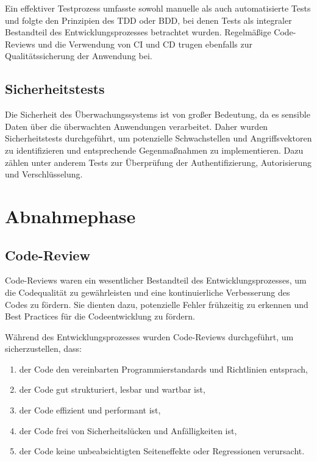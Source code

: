 \begin{flushleft}
			Ein effektiver Testprozess umfasste sowohl manuelle als auch automatisierte Tests und folgte den Prinzipien des \acs{TDD} oder \acs{BDD}, bei denen Tests als integraler Bestandteil des Entwicklungsprozesses betrachtet wurden. Regelmäßige Code-Reviews und die Verwendung von \acs{CI} und \acs{CD} trugen ebenfalls zur Qualitätssicherung der Anwendung bei.

		\subsection{Sicherheitstests}
			Die Sicherheit des Überwachungssystems ist von großer Bedeutung, da es sensible Daten über die überwachten Anwendungen verarbeitet. Daher wurden Sicherheitstests durchgeführt, um potenzielle Schwachstellen und Angriffsvektoren zu identifizieren und entsprechende Gegenmaßnahmen zu implementieren. Dazu zählen unter anderem Tests zur Überprüfung der Authentifizierung, Autorisierung und Verschlüsselung.

	\section{Abnahmephase}

		\subsection{Code-Review}
			Code-Reviews waren ein wesentlicher Bestandteil des Entwicklungsprozesses, um die Codequalität zu gewährleisten und eine kontinuierliche Verbesserung des Codes zu fördern. Sie dienten dazu, potenzielle Fehler frühzeitig zu erkennen und Best Practices für die Codeentwicklung zu fördern.

			Während des Entwicklungsprozesses wurden Code-Reviews durchgeführt, um sicherzustellen, dass:

			\begin{enumerate}
				\item der Code den vereinbarten Programmierstandards und Richtlinien entsprach,
				\item der Code gut strukturiert, lesbar und wartbar ist,
				\item der Code effizient und performant ist,
				\item der Code frei von Sicherheitslücken und Anfälligkeiten ist,
				\item der Code keine unbeabsichtigten Seiteneffekte oder Regressionen verursacht.
			\end{enumerate}


\end{flushleft}
